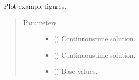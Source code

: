 \documentclass[letterpaper,10pt,english]{sphinxmanual}
\begin{document}
\begin{fulllineitems}
\label{\detokenize{helpers:helpers.plot}}
\pysigstartsignatures
{}
\pysigstopsignatures
\sphinxAtStartPar
Plot example figures.
\begin{quote}\begin{description}
\item[{Parameters}] \leavevmode\begin{itemize}
\item {} 
\sphinxAtStartPar
{} () \textendash{} Continuous\sphinxhyphen{}time solution.

\item {} 
\sphinxAtStartPar
{} () \textendash{} Continuous\sphinxhyphen{}time solution.

\item {} 
\sphinxAtStartPar
{} () \textendash{} Base values.

\end{itemize}

\end{description}\end{quote}

\end{fulllineitems}

\end{document}
